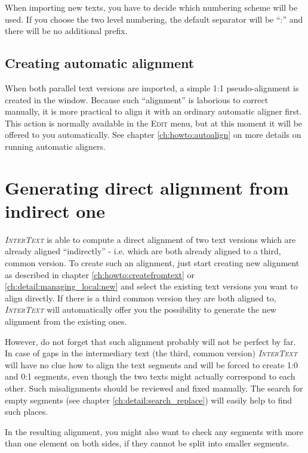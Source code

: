 \documentclass[a4paper,10pt,oneside]{book}
\newcommand{\IT}{\textit{\textsc{InterText}}\xspace}
\newcommand{\menu}[1]{\textsc{#1}}
\begin{document}
When importing new texts, you have to decide which numbering scheme will be used. If you choose the two level numbering, the default separator will be ``:'' and there will be no additional prefix.

\subsection{Creating automatic alignment}\label{ch:detail:managing_local:new:align}

When both parallel text versions are imported, a simple 1:1 pseudo-alignment is created in the window. Because such ``alignment'' is laborious to correct manually, it is more practical to align it with an ordinary automatic aligner first. This action is normally available in the \menu{Edit} menu, but at this moment it will be offered to you automatically. See chapter \ref{ch:howto:autoalign} on more details on running automatic aligners.

\section{Generating direct alignment from indirect one}\label{ch:detail:managing_local:generate}

\IT is able to compute a direct alignment of two text versions which are already aligned ``indirectly'' - i.e. which are both already aligned to a third, common version. To create such an alignment, just start creating new alignment as described in chapter \ref{ch:howto:createfromtext} or \ref{ch:detail:managing_local:new} and select the existing text versions you want to align directly. If there is a third common version they are both aligned to, \IT will automatically offer you the possibility to generate the new alignment from the existing ones.

However, do not forget that such alignment probably will not be perfect by far. In case of gaps in the intermediary text (the third, common version) \IT will have no clue how to align the text segments and will be forced to create 1:0 and 0:1 segments, even though the two texts might actually correspond to each other. Such misalignments should be reviewed and fixed manually. The search for empty segments (see chapter \ref{ch:detail:search_replace}) will easily help to find such places.

In the resulting alignment, you might also want to check any segments with more than one element on both sides, if they cannot be split into smaller segments.
\end{document}
